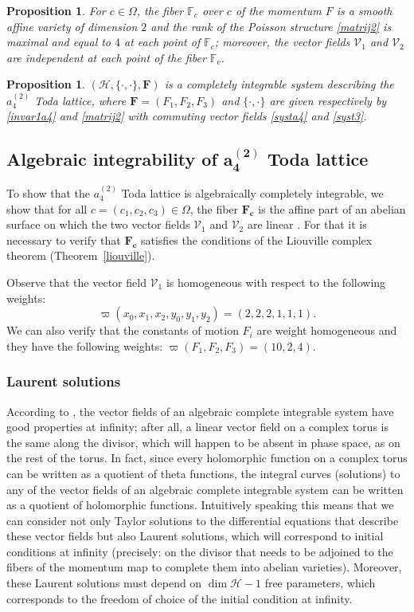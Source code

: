 \documentclass[pdftex]{sigma}
\numberwithin{equation}{section}
\newtheorem{Proposition}[Theorem]{Proposition}
 { \theoremstyle{definition}
\newtheorem{Definition}[Theorem]{Definition}
\newtheorem{Note}[Theorem]{Note}
\newtheorem{Example}[Theorem]{Example}
\newtheorem{Remark}[Theorem]{Remark} }
\begin{document}
\begin{Proposition}
For $c\in \Omega$, the fiber $\mathbb{F}_c$ over $c$ of the momentum
$F$ is a smooth affine variety of dimension $2$ and the rank of the
Poisson structure \eqref{matrij2} is maximal and equal to $4$ at
each point of $\mathbb{F}_c$; moreover, the vector fields
$\mathcal{V}_1$ and $\mathcal{V}_2$ are independent at each point
of the fiber $\mathbb{F}_c$.
\end{Proposition}

\begin{Proposition}
$(\mathcal{H}, \{\cdot,\cdot\},\mathbf{F})$ is a
completely integrable system
 describing the $a_4^{(2)}$ Toda lattice, where
$\mathbf{F}=(F_1,F_2,F_3)$ and $\{\cdot,\cdot\}$ are
given respectively by \eqref{invar1a4} and \eqref{matrij2} with
commuting vector fields \eqref{systa4} and \eqref{syst3}.
\end{Proposition}
\subsection[Algebraic integrability of a\_4\^{}(2) Toda lattice]{Algebraic integrability of $\boldsymbol{a_4^{(2)}}$ Toda lattice}

To show that the $a_4^{(2)}$ Toda lattice is
algebraically completely integrable, we show that for all
$c=(c_1,c_2,c_3)\in \Omega$, the fiber $\mathbf{F_c}$ is
the affine part of an abelian surface on which the two vector fields
$\mathcal{V}_1$ and $\mathcal{V}_2$ are linear \cite{Dehainsala}.
For that it is necessary to verify that $\mathbf{F_c}$
satisfies the conditions of the Liouville complex theorem (Theorem~\ref{liouville}).

 Observe that the vector field $\mathcal{V}_1$ is homogeneous with respect to the following weights:
\[\varpi(x_0,x_1,x_2,y_0,y_1,y_2)=(2,2,2,1,1,1).\]
We can also verify that the constants of motion $F_i$ are weight
homogeneous and they have the following weights:
$\varpi(F_1,F_2,F_3)=(10,2,4).$
\subsubsection{Laurent solutions}

According to \cite{al_Moer3}, the vector fields of an algebraic complete integrable system
have good properties at infinity; after all, a linear vector field
on a complex torus is the same along the divisor, which will happen
to be absent in phase space, as on the rest of the torus. In fact,
since every holomorphic function on a complex torus can be written
as a quotient of theta functions, the integral curves (solutions) to
any of the vector fields of an algebraic complete integrable system can be written as a
quotient of holomorphic functions. Intuitively speaking this means
that we can consider not only Taylor solutions to the differential
equations that describe these vector fields but also Laurent
solutions, which will correspond to initial conditions at infinity (precisely: on the divisor that needs to be adjoined to the fibers of
the momentum map to complete them into abelian varieties). Moreover,
these Laurent solutions must depend on $\dim \mathcal{H}-1$
free parameters, which corresponds to the freedom of choice of the
initial condition at infinity.
\end{document}
